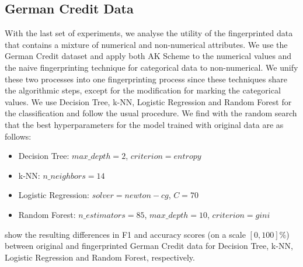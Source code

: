 \subsection{German Credit Data}
With the last set of experiments, we analyse the utility of the fingerprinted data that contains a mixture of numerical and non-numerical attributes.
We use the German Credit dataset and apply both AK Scheme to the numerical values and the naive fingerprinting technique for categorical data to non-numerical. 
We unify these two processes into one fingerprinting process since these techniques share the algorithmic steps, except for the modification for marking the categorical values. 
We use Decision Tree, k-NN, Logistic Regression and Random Forest for the classification and follow the usual procedure. We find with the random search that the best hyperparameters for the model trained with original data are as follows:
\begin{itemize}
    \item Decision Tree: $max\_depth=2$, $criterion=entropy$
    \item k-NN: $n\_neighbors=14$
    \item Logistic Regression: $solver=newton-cg$, $C=70$
    \item Random Forest: $n\_estimators=85$, $max\_depth=10$, $criterion=gini$
\end{itemize}

 show the resulting differences in F1 and accuracy scores (on a scale $[0,100]\%$) between original and fingerprinted German Credit data for Decision Tree, k-NN, Logistic Regression and Random Forest, respectively.


